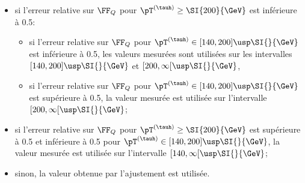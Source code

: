 \begin{itemize}
\item si l'erreur relative sur $\FF_Q$ pour $\pT^{(\tauh)}\geq\SI{200}{\GeV}$ est inférieure à \num{0.5}:
\begin{itemize}
\item si l'erreur relative sur $\FF_Q$ pour $\pT^{(\tauh)}\in[140, 200]\usp\SI{}{\GeV}$ est inférieure à \num{0.5}, les valeurs mesurées sont utilisées sur les intervalles $[140, 200]\usp\SI{}{\GeV}$ et $[200, \infty[\usp\SI{}{\GeV}$,
\item si l'erreur relative sur $\FF_Q$ pour $\pT^{(\tauh)}\in[140, 200]\usp\SI{}{\GeV}$ est supérieure à \num{0.5}, la valeur mesurée est utilisée sur l'intervalle $[200, \infty[\usp\SI{}{\GeV}$;
\end{itemize}
\item si l'erreur relative sur $\FF_Q$ pour $\pT^{(\tauh)}\geq\SI{200}{\GeV}$ est supérieure à \num{0.5}
et inférieure à \num{0.5} pour $\pT^{(\tauh)}\in[140, 200]\usp\SI{}{\GeV}$,
la valeur mesurée est utilisée sur l'intervalle $[140, \infty[\usp\SI{}{\GeV}$;
\item sinon, la valeur obtenue par l'ajustement est utilisée.
\end{itemize}
